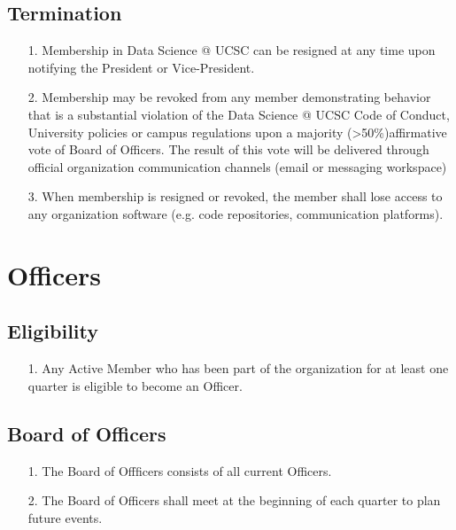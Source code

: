 \documentclass{article}
\begin{document}
\subsection{Termination}
\begin{itemize}
    \item[1.] Membership in Data Science @ UCSC can be resigned at any time upon notifying the 
    President or Vice-President.
    \item[2.] Membership may be revoked from any member demonstrating behavior that is a 
    substantial  violation of the Data Science @ UCSC Code of Conduct, University policies or campus  regulations upon a majority (>50\%)affirmative vote of Board of Officers.
    The result of this vote will be delivered through official organization communication 
    channels  (email or messaging workspace)
    \item[3.] When membership is resigned or revoked, the member shall lose
    access to any organization software (e.g. code repositories, communication platforms).    
\end{itemize}


\section{Officers}

\subsection{Eligibility}
\begin{itemize}
    \item[1.] Any Active Member who has been part of the organization
    for at least one quarter is eligible to become an Officer.
\end{itemize}

\subsection{Board of Officers}
\begin{itemize}
    \item[1.] The Board of Offficers consists of all current Officers.
    \item[2.] The Board of Officers shall meet at the beginning of each quarter to plan 
    future events. 
\end{itemize}
\end{document}
